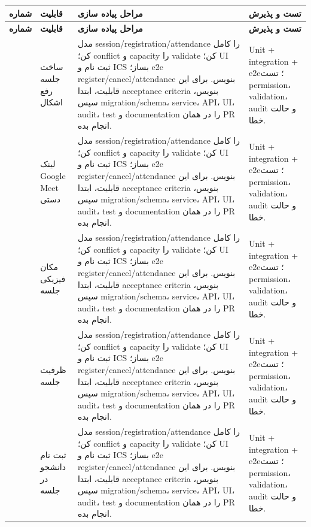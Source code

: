 \documentclass[11pt,a4paper]{article}
\begin{document}
\begin{longtable}{|>{\raggedleft\arraybackslash}p{}|>{\raggedleft\arraybackslash}p{}|>{\raggedleft\arraybackslash}p{}|>{\raggedleft\arraybackslash}p{}|}
\hline
\textbf{شماره} & \textbf{قابلیت} & \textbf{مراحل پیاده سازی} & \textbf{تست و پذیرش} \\\hline
\endfirsthead
\hline
\textbf{شماره} & \textbf{قابلیت} & \textbf{مراحل پیاده سازی} & \textbf{تست و پذیرش} \\\hline
\endhead
91 & ساخت جلسه رفع اشکال & مدل session/registration/attendance را کامل کن؛ conflict و capacity را validate کن؛ UI ثبت نام و ICS بساز؛ e2e register/cancel/attendance بنویس. برای این قابلیت، ابتدا acceptance criteria بنویس، سپس migration/schema، service، API، UI، audit، test و documentation را در همان PR انجام بده. & Unit + integration + e2e؛ تست permission، validation، audit و حالت خطا. \\ \hline
92 & لینک Google Meet دستی & مدل session/registration/attendance را کامل کن؛ conflict و capacity را validate کن؛ UI ثبت نام و ICS بساز؛ e2e register/cancel/attendance بنویس. برای این قابلیت، ابتدا acceptance criteria بنویس، سپس migration/schema، service، API، UI، audit، test و documentation را در همان PR انجام بده. & Unit + integration + e2e؛ تست permission، validation، audit و حالت خطا. \\ \hline
93 & مکان فیزیکی جلسه & مدل session/registration/attendance را کامل کن؛ conflict و capacity را validate کن؛ UI ثبت نام و ICS بساز؛ e2e register/cancel/attendance بنویس. برای این قابلیت، ابتدا acceptance criteria بنویس، سپس migration/schema، service، API، UI، audit، test و documentation را در همان PR انجام بده. & Unit + integration + e2e؛ تست permission، validation، audit و حالت خطا. \\ \hline
94 & ظرفیت جلسه & مدل session/registration/attendance را کامل کن؛ conflict و capacity را validate کن؛ UI ثبت نام و ICS بساز؛ e2e register/cancel/attendance بنویس. برای این قابلیت، ابتدا acceptance criteria بنویس، سپس migration/schema، service، API، UI، audit، test و documentation را در همان PR انجام بده. & Unit + integration + e2e؛ تست permission، validation، audit و حالت خطا. \\ \hline
95 & ثبت نام دانشجو در جلسه & مدل session/registration/attendance را کامل کن؛ conflict و capacity را validate کن؛ UI ثبت نام و ICS بساز؛ e2e register/cancel/attendance بنویس. برای این قابلیت، ابتدا acceptance criteria بنویس، سپس migration/schema، service، API، UI، audit، test و documentation را در همان PR انجام بده. & Unit + integration + e2e؛ تست permission، validation، audit و حالت خطا. \\ \hline

\end{longtable}
\end{document}
